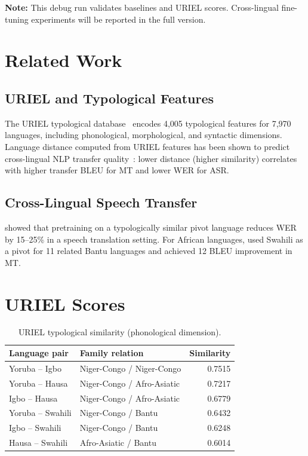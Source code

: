 \documentclass[11pt,a4paper]{article}
\begin{document}
\textbf{Note:} This debug run validates baselines and URIEL scores. Cross-lingual fine-tuning experiments will be reported in the full version.

\section{Related Work}
\label{sec:related}

\subsection{URIEL and Typological Features}
The URIEL typological database~\citep{littell2017uriel} encodes 4,005 typological features for 7,970 languages, including phonological, morphological, and syntactic dimensions. Language distance computed from URIEL features has been shown to predict cross-lingual NLP transfer quality~\citep{dalmia2021searchable}: lower distance (higher similarity) correlates with higher transfer BLEU for MT and lower WER for ASR.

\subsection{Cross-Lingual Speech Transfer}
\citet{li2020multilingual} showed that pretraining on a typologically similar pivot language reduces WER by 15–25\% in a speech translation setting. For African languages, \citet{adams2019massively} used Swahili as a pivot for 11 related Bantu languages and achieved 12 BLEU improvement in MT.

\section{URIEL Scores}

\begin{table}[t]
\centering
\small
\caption{URIEL typological similarity (phonological dimension).}
\label{tab:uriel}
\begin{tabular}{llr}
\toprule
\textbf{Language pair} & \textbf{Family relation} & \textbf{Similarity} \\
\midrule
Yoruba – Igbo    & Niger-Congo / Niger-Congo & 0.7515 \\
Yoruba – Hausa   & Niger-Congo / Afro-Asiatic & 0.7217 \\
Igbo – Hausa     & Niger-Congo / Afro-Asiatic & 0.6779 \\
Yoruba – Swahili & Niger-Congo / Bantu        & 0.6432 \\
Igbo – Swahili   & Niger-Congo / Bantu        & 0.6248 \\
Hausa – Swahili  & Afro-Asiatic / Bantu       & 0.6014 \\
\bottomrule
\end{tabular}
\end{table}
\end{document}
